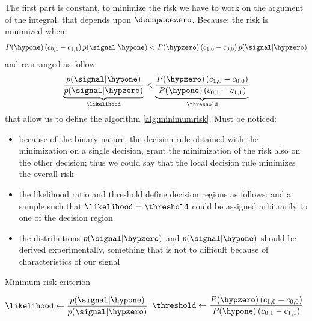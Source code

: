 The first part is constant, to minimize the risk we have to work on the argument of the integral, that depends upon ${\decspacezero}$. Because:
the risk is minimized when:
\begin{equation}
P(\hypone)\braces{c_{0,1} - c_{1,1}} p(\signal|\hypone) < P(\hypzero)\braces{c_{1,0} - c_{0,0}} p(\signal|\hypzero)
\end{equation}
and rearranged as follow
\begin{equation}
\naming{ \dfrac{p(\signal|\hypone)}{p(\signal|\hypzero)} }{\likelihood} < \naming{ \dfrac{P(\hypzero)\braces{c_{1,0} - c_{0,0}}}{P(\hypone)\braces{c_{0,1} - c_{1,1}}} }{\threshold}
\end{equation}
that allow us to define the algorithm \ref{alg:minimumrisk}. Must be noticed:
\begin{itemize}
\item because of the binary nature, the decision rule obtained with the minimization on a single decision, grant the minimization of the risk also on the other decision; thus we could say that the local decision rule minimizes the overall risk
\item the likelihood ratio and threshold define decision regions as follows:
\arraymath{
	\decspacezero &=& \{ \signal\in\decspace \,:\,\likelihood<\threshold \} \\
	\decspaceone &=& \{ \signal\in\decspace \,:\,\likelihood>\threshold \} 
}
and a sample such that $\likelihood=\threshold$ could be assigned arbitrarily to one of the decision region
\item the distributions ${p(\signal|\hypzero)}$ and ${p(\signal|\hypone)}$ should be derived experimentally, something that is not to difficult because of characteristics of our signal
\end{itemize}
\begin{algorithm}[h]
\caption{Minimum risk criterion}
\label{alg:minimumrisk}
$\likelihood \leftarrow \dfrac{p(\signal|\hypone)}{p(\signal|\hypzero)} $ \;
$\threshold \leftarrow \dfrac{P(\hypzero)\braces{c_{1,0} - c_{0,0}}}{P(\hypone)\braces{c_{0,1} - c_{1,1}}}$ \;
\end{algorithm}

